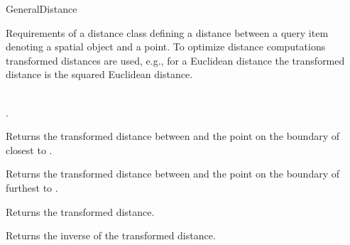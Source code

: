 

\begin{ccRefConcept}{GeneralDistance}


\ccDefinition

Requirements of a distance class defining a distance between a query item
denoting a spatial object and a point.
To optimize distance computations transformed distances are used,
e.g., for a Euclidean distance the transformed distance is the squared
Euclidean distance.

\ccHasModels

\\
.


\ccTypes



\ccOperations


{Returns the transformed distance between  and
the point on the boundary of  closest to .}

{Returns the transformed distance between  and
the point on the boundary of  furthest to .}

 {Returns the transformed distance.}

 {Returns the inverse of the transformed distance.}




\end{ccRefConcept}


